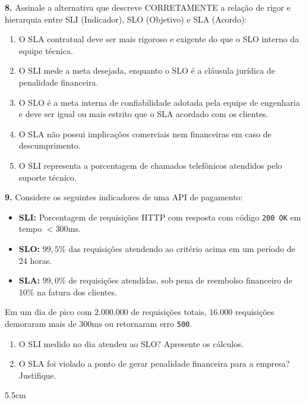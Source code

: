 \documentclass[12pt]{article}
\begin{document}
\textbf{8.} Assinale a alternativa que descreve CORRETAMENTE a relação de rigor e hierarquia entre SLI (Indicador), SLO (Objetivo) e SLA (Acordo):
\begin{enumerate}[label=\alph*)]
    \item O SLA contratual deve ser mais rigoroso e exigente do que o SLO interno da equipe técnica.
    \item O SLI mede a meta desejada, enquanto o SLO é a cláusula jurídica de penalidade financeira.
    \item O SLO é a meta interna de confiabilidade adotada pela equipe de engenharia e deve ser igual ou mais estrito que o SLA acordado com os clientes.
    \item O SLA não possui implicações comerciais nem financeiras em caso de descumprimento.
    \item O SLI representa a porcentagem de chamados telefônicos atendidos pelo suporte técnico.
\end{enumerate}

\vspace{0.4cm}

\textbf{9.} Considere os seguintes indicadores de uma API de pagamento:
\begin{itemize}
    \item \textbf{SLI:} Porcentagem de requisições HTTP com resposta com código \texttt{200 OK} em tempo $< 300\text{ms}$.
    \item \textbf{SLO:} $99,5\%$ das requisições atendendo ao critério acima em um período de 24 horas.
    \item \textbf{SLA:} $99,0\%$ de requisições atendidas, sob pena de reembolso financeiro de 10\% na fatura dos clientes.
\end{itemize}
Em um dia de pico com $2.000.000$ de requisições totais, $16.000$ requisições demoraram mais de $300\text{ms}$ ou retornaram erro \texttt{500}.
\begin{enumerate}[label=\alph*)]
    \item O SLI medido no dia atendeu ao SLO? Apresente os cálculos.
    \item O SLA foi violado a ponto de gerar penalidade financeira para a empresa? Justifique.
\end{enumerate}
\begin{resposta}{5.5cm}
\end{resposta}

\vspace{0.4cm}
\end{document}
